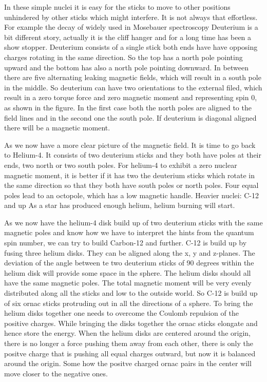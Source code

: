 In these simple nuclei it is easy for the sticks to move to other positions unhindered by other sticks which might interfere. It is not always that effortless. For example the decay of widely used in Mosebauer spectroscopy
Deuterium is a bit different story, actually it is the cliff hanger and for a long time has been a show stopper. Deuterium consists of a single stick both ends have have opposing charges rotating in the same direction. So the top has a north pole pointing upward and the bottom has also a north pole pointing downward. In between there are five alternating leaking magnetic fields, which will result in a south pole in the middle. So deuterium can have two orientations to the external filed, which result in a zero torque force and zero magnetic moment and representing spin 0, as shown in the figure. In the first case both the north poles are aligned to the field lines and in the second one the south pole. If deuterium is diagonal aligned there will be a magnetic moment.

As we now have a more clear picture of the magnetic field. It is time to go back to Helium-4. It consists of two deuterium sticks and they both have poles at their ends, two north or two south poles. For helium-4 to exhibit a zero nuclear magnetic moment, it is better if it has two the deuterium sticks which rotate in the same direction so that they both have south poles or north poles. Four equal poles lead to an octopole, which has a low magnetic handle.
Heavier nuclei: C-12 and up
As a star has produced enough helium, helium burning will start.

As we now have the helium-4 disk build up of two deuterium sticks with the same magnetic poles and know how we have to interpret the hints from the quantum spin number, we can try to build Carbon-12 and further. C-12 is build up by fusing three helium disks. They can be aligned along the x, y and z-planes. The deviation of the angle between te two deuterium sticks of 90 degrees within the helium disk will provide some space in the sphere. The helium disks should all have the same magnetic poles. The total magnetic moment will be very evenly distributed along all the sticks and low to the outside world. So C-12 is build up of six ornac sticks protruding out in all the directions of a sphere. To bring the helium disks together one needs to overcome the Coulomb repulsion of the positive charges. While bringing the disks together the ornac sticks elongate and hence store the energy. When the helium disks are centered around the origin, there is no longer a force pushing them away from each other, there is only the positve charge that is pushing all equal charges outward, but now it is balanced around the origin. Some how the positve charged ornac pairs in the center will move closer to the negative ones.

